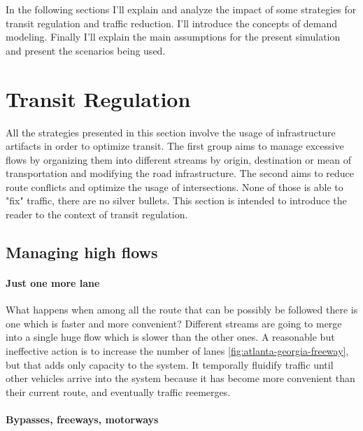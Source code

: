 In the following sections I'll explain and analyze the impact of some strategies for transit regulation and traffic reduction. I'll introduce the concepts of demand modeling. Finally I'll explain the main assumptions for the present simulation and present the scenarios being used.

\section{Transit Regulation}

All the strategies presented in this section involve the usage of infrastructure artifacts in order to optimize transit. The first group aims to manage excessive flows by organizing them into different streams by origin, destination or mean of transportation and modifying the road infrastructure. The second aims to reduce route conflicts and optimize the usage of intersections. None of those is able to "fix" traffic, there are no silver bullets. This section is intended to introduce the reader to the context of transit regulation.

\subsection{Managing high flows}

\paragraph{Just one more lane}

What happens when among all the route that can be possibly be followed there is one which is faster and more convenient? Different streams are going to merge into a single huge flow which is slower than the other ones. A reasonable but ineffective action is to increase the number of lanes \ref{fig:atlanta-georgia-freeway}, but that adds only capacity to the system. It temporally fluidify traffic until other vehicles arrive into the system because it has become more convenient than their current route, and eventually traffic reemerges.


\paragraph{Bypasses, freeways, motorways}

